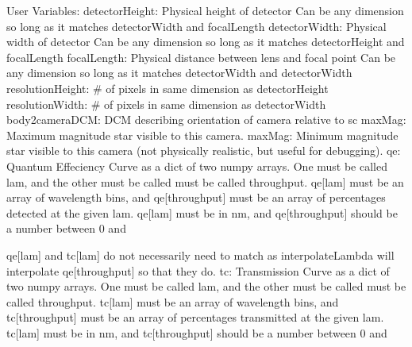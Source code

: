 User Variables\+: detector\+Height\+: Physical height of detector Can be any dimension so long as it matches detector\+Width and focal\+Length detector\+Width\+: Physical width of detector Can be any dimension so long as it matches detector\+Height and focal\+Length focal\+Length\+: Physical distance between lens and focal point Can be any dimension so long as it matches detector\+Width and detector\+Width resolution\+Height\+: \# of pixels in same dimension as detector\+Height resolution\+Width\+: \# of pixels in same dimension as detector\+Width body2camera\+D\+CM\+: D\+CM describing orientation of camera relative to sc max\+Mag\+: Maximum magnitude star visible to this camera. max\+Mag\+: Minimum magnitude star visible to this camera (not physically realistic, but useful for debugging). qe\+: Quantum Effeciency Curve as a dict of two numpy arrays. One must be called \textquotesingle{}lam\textquotesingle{}, and the other must be called must be called \textquotesingle{}throughput\textquotesingle{}. qe\mbox{[}\textquotesingle{}lam\textquotesingle{}\mbox{]} must be an array of wavelength bins, and qe\mbox{[}\textquotesingle{}throughput\textquotesingle{}\mbox{]} must be an array of percentages detected at the given \textquotesingle{}lam\textquotesingle{}. qe\mbox{[}\textquotesingle{}lam\textquotesingle{}\mbox{]} must be in nm, and qe\mbox{[}\textquotesingle{}throughput\textquotesingle{}\mbox{]} should be a number between 0 and
\begin{DoxyEnumerate}
\item qe\mbox{[}\textquotesingle{}lam\textquotesingle{}\mbox{]} and tc\mbox{[}\textquotesingle{}lam\textquotesingle{}\mbox{]} do not necessarily need to match as interpolate\+Lambda will interpolate qe\mbox{[}\textquotesingle{}throughput\textquotesingle{}\mbox{]} so that they do. tc\+: Transmission Curve as a dict of two numpy arrays. One must be called \textquotesingle{}lam\textquotesingle{}, and the other must be called must be called \textquotesingle{}throughput\textquotesingle{}. tc\mbox{[}\textquotesingle{}lam\textquotesingle{}\mbox{]} must be an array of wavelength bins, and tc\mbox{[}\textquotesingle{}throughput\textquotesingle{}\mbox{]} must be an array of percentages transmitted at the given \textquotesingle{}lam\textquotesingle{}. tc\mbox{[}\textquotesingle{}lam\textquotesingle{}\mbox{]} must be in nm, and tc\mbox{[}\textquotesingle{}throughput\textquotesingle{}\mbox{]} should be a number between 0 and
\end{DoxyEnumerate}

